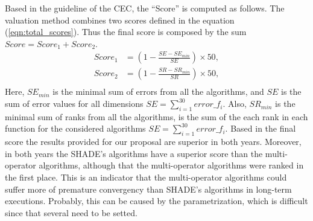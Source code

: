 Based in the guideline of the CEC, the ``Score'' is computed as follows.
%
The valuation method combines two scores defined in the equation (\ref{eqn:total_scores}).
%
Thus the final score is composed by the sum $Score = Score_1 + Score_2$.
%
\begin{equation}\label{eqn:total_scores}
\begin{split}
Score_1 &= \left (1 - \frac{SE - SE_{min}}{SE} \right) \times 50, \\
Score_2 &= \left  (1 - \frac{SR - SR_{min}}{SR} \right ) \times 50, \\
\end{split}
\end{equation}
Here, $SE_{min}$ is the minimal sum of errors from all the algorithms, and $SE$ is the sum of error values for all dimensions $SE = \sum_{i=1}^{30} error\_f_i$.
%
Also, $SR_{min}$ is the minimal sum of ranks from all the algorithms, is the sum of the each rank in each function for the considered algorithms $SE = \sum_{i=1}^{30} error\_f_i$.
%
Based in the final score the results provided for our proposal are superior in both years.
%
Moreover, in both years the SHADE's algorithms have a superior score than the multi-operator algorithms, although that the multi-operator algorithms were ranked in the first place.
%
This is an indicator that the multi-operator algorithms could suffer more of premature convergency than SHADE's algorithms in long-term executions.
%
Probably, this can be caused by the parametrization, which is difficult since that several need to be setted.
%




\begin{table}[t]
\centering
\caption{Summary results - CEC 2016}
\label{tab:Summary_CEC2016}
\end{table}


